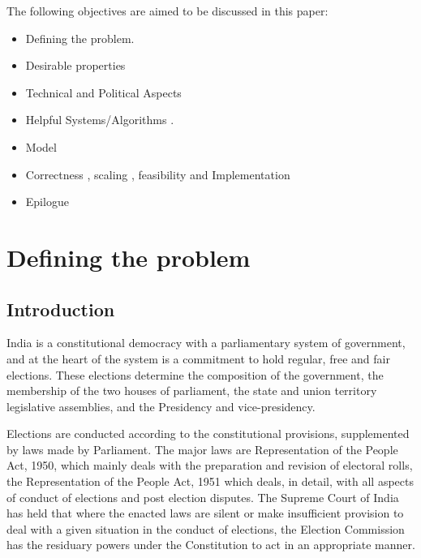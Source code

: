 \documentclass[12pt]{report}
\begin{document}
\vspace{0.5cm}

The following objectives are aimed to be discussed in this paper:
\begin{itemize}
  \item
  Defining the problem.
  \item
  Desirable properties 
  \item
  Technical and Political Aspects
  \item
  Helpful Systems/Algorithms .
  \item
  Model  
  \item
  Correctness , scaling , feasibility and Implementation
  \item 
  Epilogue
\end{itemize}

\chapter{Defining the problem}
\section{Introduction}

India is a constitutional democracy with a parliamentary system of government, and at the heart of the system is a commitment to hold regular, free and fair elections. These elections determine the composition of the government, the membership of the two houses of parliament, the state and union territory legislative assemblies, and the Presidency and vice-presidency.

Elections are conducted according to the constitutional provisions, supplemented by laws made by Parliament. The major laws are Representation of the People Act, 1950, which mainly deals with the preparation and revision of electoral rolls, the Representation of the People Act, 1951 which deals, in detail, with all aspects of conduct of elections and post election disputes. The Supreme Court of India has held that where the enacted laws are silent or make insufficient provision to deal with a given situation in the conduct of elections, the Election Commission has the residuary powers under the Constitution to act in an appropriate manner. 
\end{document}
